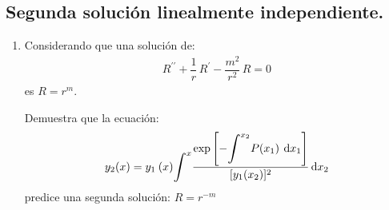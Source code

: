 \documentclass[hidelinks,12pt]{article}
\def\scaleint#1{\vcenter{\hbox{\scaleto[3ex]{\displaystyle\int}{#1}}}}
\newcommand{\pderivada}[1]{\ensuremath{{#1}^{\prime}}}
\newcommand{\sderivada}[1]{\ensuremath{{#1}^{\prime \prime}}}
\begin{document}
\subsection*{Segunda solución linealmente independiente.}

\begin{enumerate}
    \item Considerando que una solución de:
    \begin{align*}
        \sderivada{R} + \dfrac{1}{r} \, \pderivada{R} - \dfrac{m^{2}}{r^{2}} \, R = 0
    \end{align*}
    es $R = r^{m}$.
    
    Demuestra que la ecuación:
    \begin{align*}
        y_{2} (x) =  y_{1} \: (x) \scaleint{6ex}^{x} \dfrac{\exp \left[ \displaystyle - \scaleint{6ex}^{x_{2}} P (x_{1}) \: \dd{x_{1}} \right]}{[y_{1} (x_{2})]^{2}} \dd{x_{2}}
    \end{align*}
    predice una segunda solución: $R = r^{-m}$
\end{enumerate}
\end{document}
